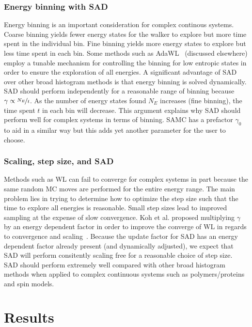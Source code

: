 \documentclass[letterpaper,twocolumn,amsmath,amssymb,pre,aps,10pt]{revtex4-1}
\begin{document}
\subsubsection{Energy binning with SAD}

Energy binning is an important consideration for complex continous
systems. Coarse binning yields fewer energy states for the walker to
explore but more time spent in the individual bin. Fine binning yields
more energy states to explore but less time spent in each bin.  Some
methods such as AdaWL~\cite{koh2013dynamically} (discussed elsewhere)
employ a tunable mechanism for controlling the binning for low entropic
states in order to ensure the exploration of all energies. A
significant advantage of SAD over other broad histogram methods is that
energy binning is solved dynamically. SAD should perform independently
for a reasonable range of binning because $\gamma \propto
\nicefrac{N_{E}}{t}$.  As the number of energy states found $N_{E}$
increases (fine binning), the time spent $t$ in each bin will decrease.
This argument explains why SAD should perform well for complex systems
in terms of binning. SAMC has a prefactor $\gamma_0$ to aid in a
similar way but this adds yet another parameter for the user to choose.

\subsubsection{Scaling, step size, and SAD}
Methods such as WL can fail to converge for complex systems in part
because the same random MC moves are performed for the entire energy
range.  The main problem lies in trying to determine how to optimize
the step size such that the time to explore all energies is reasonable.
Small step sizes lead to improved sampling at the expense of slow
convergence. Koh et al. proposed multiplying $\gamma$ by an energy
dependent factor in order to improve the converge of WL in regards to
convergence and scaling~\cite{koh2013dynamically}.  Because the update
factor for SAD has an energy dependent factor already present (and
dynamically adjusted), we expect that SAD will perform consitently
scaling free for a reasonable choice of step size.  SAD should perform
extremely well compared with other broad histogram methods when applied
to complex continuous systems such as polymers/proteins and spin models.

\section{Results}
\end{document}
